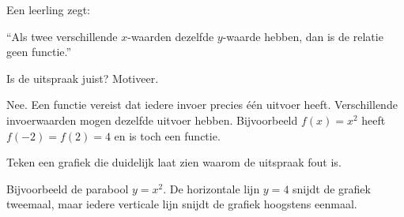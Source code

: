\documentclass{ximera}
\begin{document}
\begin{oefening}[Foutenanalyse]{\oefU\ESS}

Een leerling zegt:

\begin{center}
``Als twee verschillende \(x\)-waarden dezelfde \(y\)-waarde hebben,
dan is de relatie geen functie.''
\end{center}

\begin{question}
Is de uitspraak juist? Motiveer.

\begin{oplossing}
Nee. Een functie vereist dat iedere invoer precies één uitvoer heeft.
Verschillende invoerwaarden mogen dezelfde uitvoer hebben.
Bijvoorbeeld \(f(x)=x^2\) heeft \(f(-2)=f(2)=4\) en is toch een functie.
\end{oplossing}
\end{question}

\begin{question}
Teken een grafiek die duidelijk laat zien waarom de uitspraak fout is.

\begin{oplossing}
Bijvoorbeeld de parabool \(y=x^2\).
De horizontale lijn \(y=4\) snijdt de grafiek tweemaal, maar iedere verticale
lijn snijdt de grafiek hoogstens eenmaal.
\end{oplossing}
\end{question}

\end{oefening}

\end{document}
